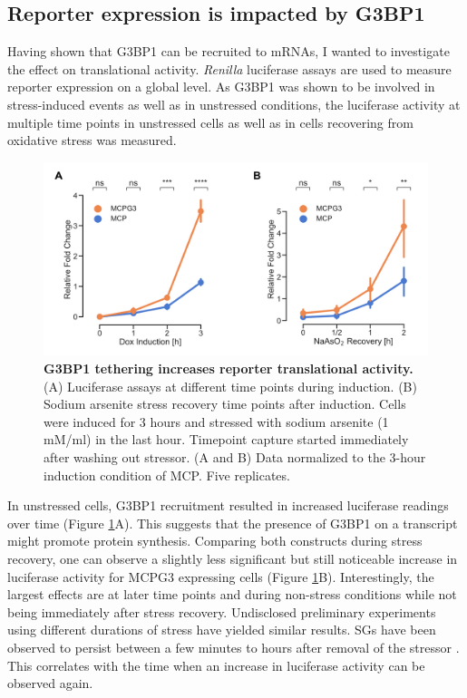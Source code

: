 \subsection{Reporter expression is impacted by G3BP1} \label{mcp_luciferase}

Having shown that G3BP1 can be recruited to mRNAs, I wanted to investigate the effect on translational activity. \textit{Renilla} luciferase assays are used to measure reporter expression on a global level.
As G3BP1 was shown to be involved in stress-induced events as well as in unstressed conditions, the luciferase activity at multiple time points in unstressed cells as well as in cells recovering from oxidative stress was measured.

\begin{figure}[t!]
    \centering
    \includegraphics[width=\linewidth]{images/figure3}
    \caption{\textbf{G3BP1 tethering increases reporter translational activity.}
        (A) Luciferase assays at different time points during induction.
        (B) Sodium arsenite stress recovery time points after induction.
            Cells were induced for 3 hours and stressed with sodium arsenite (1 mM/ml) in the last hour.
            Timepoint capture started immediately after washing out stressor.
        (A and B) Data normalized to the 3-hour induction condition of MCP. Five replicates.   
    }
    \label{fig:mcp_luciferase}
\end{figure}

In unstressed cells, G3BP1 recruitment resulted in increased luciferase readings over time (Figure \ref{fig:mcp_luciferase}A).
This suggests that the presence of G3BP1 on a transcript might promote protein synthesis.
Comparing both constructs during stress recovery, one can observe a slightly less significant but still noticeable increase in luciferase activity for MCPG3 expressing cells (Figure \ref{fig:mcp_luciferase}B).
Interestingly, the largest effects are at later time points and during non-stress conditions while not being immediately after stress recovery.
Undisclosed preliminary experiments using different durations of stress have yielded similar results.
SGs have been observed to persist between a few minutes to hours after removal of the stressor \cite{chen_relationships_2017}.
This correlates with the time when an increase in luciferase activity can be observed again.


